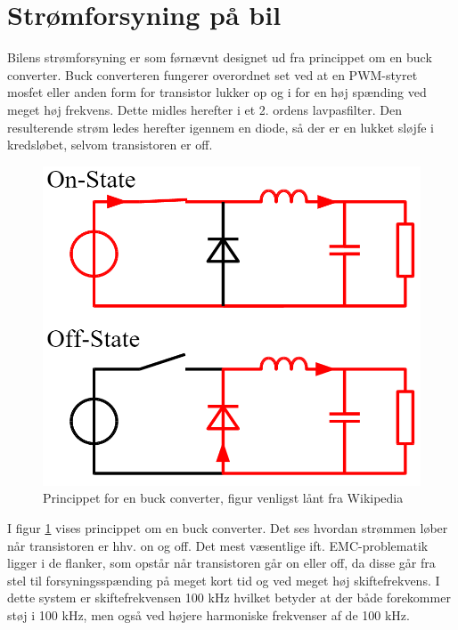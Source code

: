 \section{Strømforsyning på bil}

Bilens strømforsyning er som førnævnt designet ud fra princippet om en buck converter. Buck converteren fungerer overordnet set ved at en PWM-styret mosfet eller anden form for transistor lukker op og i for en høj spænding ved meget høj frekvens. 
Dette midles herefter i et 2. ordens lavpasfilter.
Den resulterende strøm ledes herefter igennem en diode, så der er en lukket sløjfe i kredsløbet, selvom transistoren er off.

\begin{figure}[h]
\centering
\includegraphics[width=\textwidth * 1/2]{../fig/billeder/buck_circuit_diagram}
\caption{Princippet for en buck converter, figur venligst lånt fra Wikipedia\cite{lib:buck_skitse}}
\label{fig:buck_conv}
\end{figure}

I figur \ref{fig:buck_conv} vises princippet om en buck converter. 
Det ses hvordan strømmen løber når transistoren er hhv. on og off.
Det mest væsentlige ift. EMC-problematik ligger i de flanker, som opstår når transistoren går on eller off, da disse går fra stel til forsyningsspænding på meget kort tid og ved meget høj skiftefrekvens.
I dette system er skiftefrekvensen 100 kHz hvilket betyder at der både forekommer støj i 100 kHz, men også ved højere harmoniske frekvenser af de 100 kHz.
\clearpage

